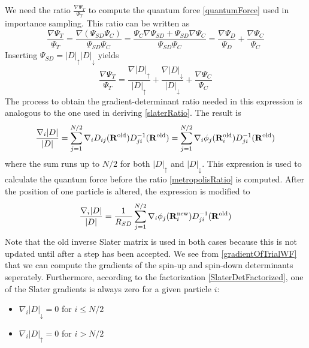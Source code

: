 \documentclass[english, a4paper]{article}
\begin{document}
We need the ratio $\frac{\nabla \Psi_T}{\Psi_T}$ to compute the quantum force \eqref{quantumForce}
used in importance sampling. This ratio can be written as
\begin{equation}
 \frac{\nabla \Psi_T}{\Psi_T} = \frac{\nabla (\Psi_{SD}\Psi_C)}{\Psi_{SD}\Psi_C} = 
 \frac{\Psi_{C}\nabla\Psi_{SD} + \Psi_{SD}\nabla\Psi_C}{\Psi_{SD}\Psi_C} = 
 \frac{\nabla \Psi_D}{\Psi_D} + \frac{\nabla \Psi_C}{\Psi_C}
\end{equation}
Inserting $\Psi_{SD} = |D|_\uparrow|D|_\downarrow$ yields
\begin{equation}
 \frac{\nabla \Psi_T}{\Psi_T} = \frac{\nabla|D|_\uparrow}{|D|_\uparrow} + 
 \frac{\nabla |D|_\downarrow}{|D|_\downarrow} + \frac{\nabla \Psi_C}{\Psi_C}
 \label{gradientOfTrialWF}
\end{equation}
The process to obtain the gradient-determinant ratio needed in this expression is analogous to
the one used in deriving \eqref{slaterRatio}. The result is
\begin{equation}
 \frac{\nabla_i |D|}{|D|} = \sum_{j=1}^{N/2} \nabla_i D_{ij}({\bf R}^{\textrm{old}}) D_{ji}^{-1}
 ({\bf R}^{\textrm{old}})
        = \sum_{j=1}^{N/2}\nabla_i \phi_j({\bf R}_i^{\textrm{old}}) D_{ji}^{-1}({\bf R}^{\textrm{old}})
        \label{gradientRatioBefore}
\end{equation}
where the sum runs up to $N/2$ for both $|D|_\uparrow$ and $|D|_\downarrow$. 
This expression is used to calculate the quantum force before the ratio \eqref{metropolisRatio} is computed. 
After the position of one particle is altered, the expression is modified to
\begin{equation}
 \frac{\nabla_i |D|}{|D|}
        = \frac{1}{R_{SD}} \sum_{j=1}^{N/2} \nabla_i \phi_j({\bf R}_i^{\textrm{new}}) D_{ji}^{-1}({\bf R}^{\textrm{old}})
        \label{gradientRatioAfter}
\end{equation}
Note that the old inverse Slater matrix is used in both cases because this is not updated until after 
a step has been accepted. We see from \eqref{gradientOfTrialWF} that we can compute
the gradients of the spin-up and spin-down determinants seperately. Furthermore, according to 
the factorization \eqref{SlaterDetFactorized},
one of the Slater gradients is always zero for a given particle $i$:
\begin{itemize}
 \item $\nabla_i |D|_\downarrow = 0$  for $i \leq N/2$
 \item $\nabla_i |D|_\uparrow = 0$ for $i > N/2$
\end{itemize}
\end{document}

